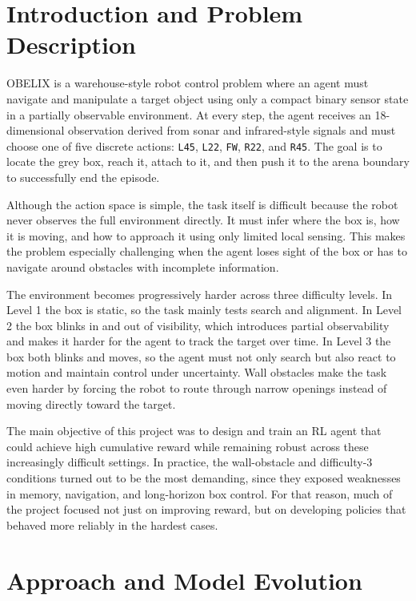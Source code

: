 \documentclass[11pt,oneside]{article}
\begin{document}
\section{Introduction and Problem Description}
OBELIX is a warehouse-style robot control problem where an agent must navigate and manipulate a target object using only a compact binary sensor state in a partially observable environment.
At every step, the agent receives an 18-dimensional observation derived from sonar and infrared-style signals and must choose one of five discrete actions: \texttt{L45}, \texttt{L22}, \texttt{FW}, \texttt{R22}, and \texttt{R45}. The goal is to locate the grey box, reach it, attach to it, and then push it to the arena boundary to successfully end the episode.

Although the action space is simple, the task itself is difficult because the robot never observes the full environment directly. It must infer where the box is, how it is moving, and how to approach it using only limited local sensing. This makes the problem especially challenging when the agent loses sight of the box or has to navigate around obstacles with incomplete information.

The environment becomes progressively harder across three difficulty levels. In Level 1 the box is static, so the task mainly tests search and alignment. In Level 2 the box blinks in and out of visibility, which introduces partial observability and makes it harder for the agent to track the target over time. In Level 3 the box both blinks and moves, so the agent must not only search but also react to motion and maintain control under uncertainty. Wall obstacles make the task even harder by forcing the robot to route through narrow openings instead of moving directly toward the target.

The main objective of this project was to design and train an RL agent that could achieve high cumulative reward while remaining robust across these increasingly difficult settings. In practice, the wall-obstacle and difficulty-3 conditions turned out to be the most demanding, since they exposed weaknesses in memory, navigation, and long-horizon box control. For that reason, much of the project focused not just on improving reward, but on developing policies that behaved more reliably in the hardest cases.

\section{Approach and Model Evolution}
\end{document}

